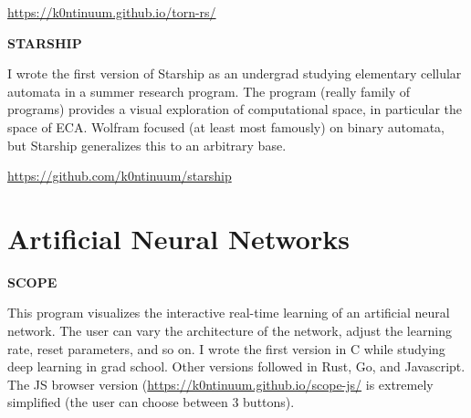 \documentclass{article}
\renewcommand{\b}{\textbf}
\begin{document}
{{\url{https://k0ntinuum.github.io/torn-rs/}

\b{STARSHIP}

I wrote the first version of Starship as an undergrad studying elementary cellular automata in a summer research program. The program (really family of programs) provides a visual exploration of computational space, in particular the space of ECA. Wolfram focused (at least most famously) on binary automata, but Starship generalizes this to an arbitrary base.

\url{https://github.com/k0ntinuum/starship}


\section*{Artificial Neural Networks}

\b{SCOPE}

This program visualizes the interactive real-time learning of an artificial neural network. The user can vary the architecture of the network, adjust the learning rate, reset parameters, and so on.  I wrote the first version in C while studying deep learning in grad school. Other versions followed in Rust, Go, and Javascript. The JS browser version (\url{https://k0ntinuum.github.io/scope-js/} is extremely simplified (the user can choose between $3$ buttons). 




}}
\end{document}
